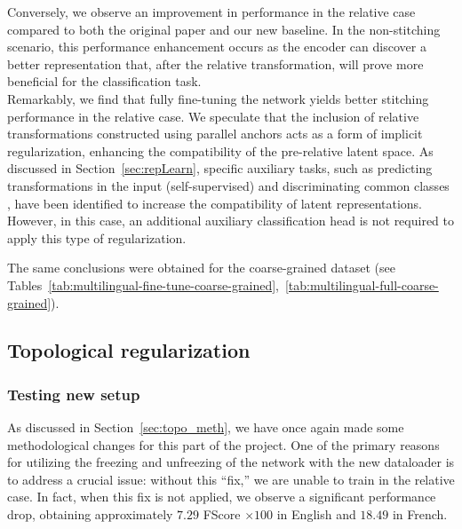 \documentclass[../main.tex]{subfiles}
\begin{document}
Conversely, we observe an improvement in performance in the relative case compared to both the original paper and our new baseline. In the non-stitching scenario, this performance enhancement occurs as the encoder can discover a better representation that, after the relative transformation, will prove more beneficial for the classification task.\\

Remarkably, we find that fully fine-tuning the network yields better stitching performance in the relative case. We speculate that the inclusion of relative transformations constructed using parallel anchors acts as a form of implicit regularization, enhancing the compatibility of the pre-relative latent space. As discussed in Section~\ref{sec:repLearn}, specific auxiliary tasks, such as predicting transformations in the input (self-supervised) and discriminating common classes \cite{gygli_towards_2020}, have been identified to increase the compatibility of latent representations. However, in this case, an additional auxiliary classification head is not required to apply this type of regularization.

\begin{mathNote}
The same conclusions were obtained for the coarse-grained dataset (see Tables~\ref{tab:multilingual-fine-tune-coarse-grained},~\ref{tab:multilingual-full-coarse-grained}).
\end{mathNote}

\subsection{Topological regularization}
\subsubsection*{Testing new setup}

As discussed in Section~\ref{sec:topo_meth}, we have once again made some methodological changes for this part of the project. One of the primary reasons for utilizing the freezing and unfreezing of the network with the new dataloader is to address a crucial issue: without this ``fix,'' we are unable to train in the relative case. In fact, when this fix is not applied, we observe a significant performance drop, obtaining approximately $7.29$ FScore $\times 100$ in English and $18.49$ in French.\\
\end{document}
